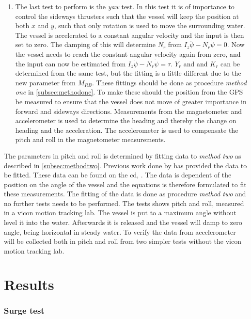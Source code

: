 \begin{enumerate}
	\item The last test to perform is the \textit{yaw} test. In this test it is of importance to control the sideways thrusters such that the vessel will keep the position at both $x$ and $y$, such that only rotation is used to move the surrounding water. The vessel is accelerated to a constant angular velocity and the input is then set to zero. The damping of this will determine $N_r$ from $I_z\ddot \psi - N_r \dot \psi = 0$. Now the vessel needs to reach the constant angular velocity again from zero, and the input can now be estimated from $I_z\ddot \psi - N_r \dot \psi = \tau$. $Y_r$ and and $K_r$ can be determined from the same test, but the fitting is a little different due to the new parameter from $M_{RB}$. These fittings should be done as procedure \textit{method one} in \ref{subsec:methodone}. To make these should the position from the \ac{GPS} be measured to ensure that the vessel does not move of greater importance in forward and sideways directions. Measurements from the magnetometer and accelerometer is used to determine the heading and thereby the change on heading and the acceleration. The accelerometer is used to compensate the pitch and roll in the magnetometer measurements.
\end{enumerate}
The parameters in pitch and roll is determined by fitting data to \textit{method two} as described in \ref{subsec:methodtwo}. Previous work done by \citep{13gr931} has provided the data to be fitted. These data can be found on the cd, . The data is dependent of the position on the angle of the vessel and the equations is therefore formulated to fit these measurements. The fitting of the data is done as procedure \textit{method two} and no further tests needs to be performed. The tests shows pitch and roll, measured in a vicon motion tracking lab. The vessel is put to a maximum angle without level it into the water. Afterwards it is released and the vessel will damp to zero angle, being horizontal in steady water. To verify the data from \citep{13gr931} accelerometer will be collected both in pitch and roll from two simpler tests without the vicon motion tracking lab.

\section{Results}
\subsubsection{Surge test}
